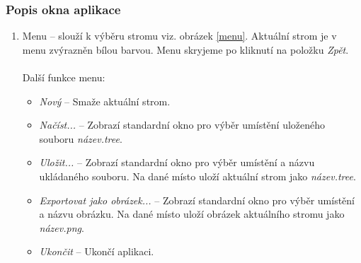 \documentclass[
  biblatex=false,
  font=serif,
  glossaries=false,
  tables=false,
  theorems=false,
  index
]{kidiplom}
\begin{document}
\subsubsection{Popis okna aplikace} 
\begin{enumerate}
\item Menu -- slouží k výběru stromu viz. obrázek \ref{menu}. Aktuální strom je v menu zvýrazněn bílou barvou. %
Menu skryjeme po kliknutí na položku \textit{Zpět}.\\\\
\noindent Další funkce menu:
\begin{itemize}
\item \textit{Nový} -- Smaže aktuální strom. %
\item \textit{Načíst...} -- Zobrazí standardní okno pro výběr umístění uloženého souboru \textit{název.tree}.%
\item \textit{Uložit...} -- Zobrazí standardní okno pro výběr umístění a názvu ukládaného souboru. Na dané místo uloží aktuální strom jako \textit{název.tree}.%
\item \textit{Exportovat jako obrázek...} -- Zobrazí standardní okno pro výběr umístění a názvu obrázku. Na dané místo uloží obrázek aktuálního stromu jako \textit{název.png}.
\item \textit{Ukončit} -- Ukončí aplikaci.
\end{itemize}


\end{enumerate}
\end{document}
